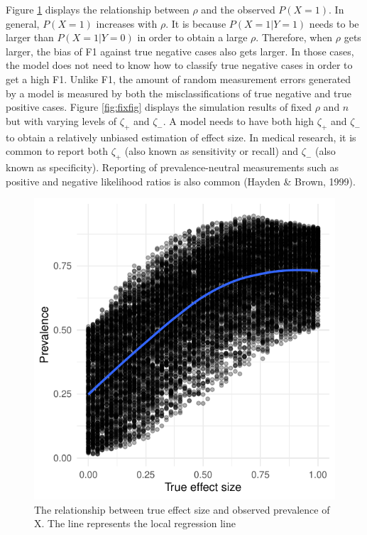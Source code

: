 \documentclass[english,man,floatsintext]{apa6}
\begin{document}
Figure \ref{fig:simfig} displays the relationship between \(\rho\) and the observed \(P(X=1)\). In general, \(P(X=1)\) increases with \(\rho\). It is because \(P(X=1|Y=1)\) needs to be larger than \(P(X=1|Y=0)\) in order to obtain a large \(\rho\). Therefore, when \(\rho\) gets larger, the bias of F1 against true negative cases also gets larger. In those cases, the model does not need to know how to classify true negative cases in order to get a high F1. Unlike F1, the amount of random measurement errors generated by a model is measured by both the misclassifications of true negative and true positive cases. Figure \ref{fig:fixfig} displays the simulation results of fixed \(\rho\) and \(n\) but with varying levels of \(\zeta_{+}\) and \(\zeta_{-}\). A model needs to have both high \(\zeta_{+}\) and \(\zeta_{-}\) to obtain a relatively unbiased estimation of effect size. In medical research, it is common to report both \(\zeta_{+}\) (also known as sensitivity or recall) and \(\zeta_{-}\) (also known as specificity). Reporting of prevalence-neutral measurements such as positive and negative likelihood ratios is also common (Hayden \& Brown, 1999).

\begin{figure}
\centering
\includegraphics{../analysis/sim_fig.pdf}
\caption{\label{fig:simfig}The relationship between true effect size and observed prevalence of X. The line represents the local regression line}
\end{figure}
\end{document}

